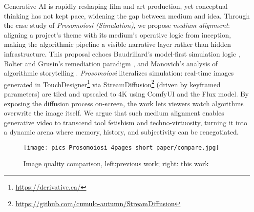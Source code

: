 \documentclass[sigconf,nonacm]{acmart}
\begin{document}
Generative AI is rapidly reshaping film and art production, yet conceptual thinking has not kept pace, widening the gap between medium and idea. Through the case study of \emph{Prosomoíosi (Simulation)}, we propose \emph{medium alignment}: aligning a project's theme with its medium's operative logic from inception, making the algorithmic pipeline a visible narrative layer rather than hidden infrastructure. This proposal echoes Baudrillard’s model-first simulation logic \cite{baudrillard_simulacra_1994}, Bolter and Grusin’s remediation paradigm \cite{bolter_remediation_1999}, and Manovich’s analysis of algorithmic storytelling \cite{manovich_language_2001}.
\emph{Prosomoíosi} literalizes simulation: real-time images generated in TouchDesigner\footnote{\url{https://derivative.ca/}} via StreamDiffusion\footnote{\url{https://github.com/cumulo-autumn/StreamDiffusion}} (driven by keyframed parameters) are tiled and upscaled to 4K using ComfyUI and the Flux model. By exposing the diffusion process on-screen, the work lets viewers watch algorithms overwrite the image itself. We argue that such medium alignment enables generative video to transcend tool fetishism and techno-virtuosity, turning it into a dynamic arena where memory, history, and subjectivity can be renegotiated.
\begin{figure*}
    \centering
    \texttt{[image: pics Prosomoiosi 4pages short paper/compare.jpg]}
    \caption{Image quality comparison, left:previous work; right: this work}
    \label{fig:enter-label}
\end{figure*}
\end{document}
